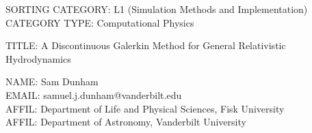 \documentclass[11pt]{article}
\begin{document}

% 
% 
% 
%



SORTING CATEGORY: L1 (Simulation Methods and Implementation) \\
CATEGORY TYPE: Computational Physics

TITLE: A Discontinuous Galerkin Method for General Relativistic Hydrodynamics



NAME: Sam Dunham \\
EMAIL: samuel.j.dunham@vanderbilt.edu \\
AFFIL: Department of Life and Physical Sciences, Fisk University \\
AFFIL: Department of Astronomy, Vanderbilt University


\end{document}
